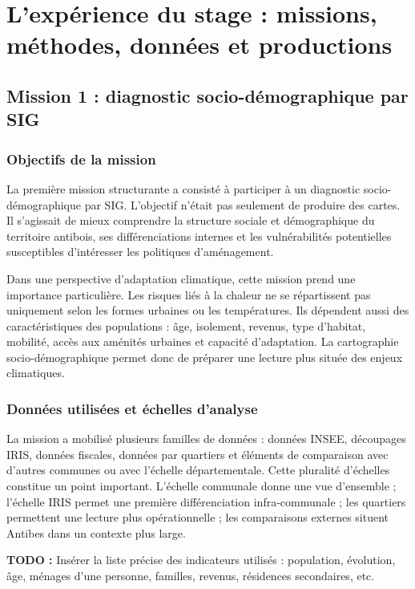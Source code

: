 \documentclass[11pt,a4paper]{report}
\newcommand{\todo}[1]{\textcolor{todored}{\textbf{TODO :} #1}}
\begin{document}
\chapter{L'expérience du stage : missions, méthodes, données et productions}

\section{Mission 1 : diagnostic socio-démographique par SIG}

\subsection{Objectifs de la mission}

La première mission structurante a consisté à participer à un diagnostic socio-démographique par SIG. L'objectif n'était pas seulement de produire des cartes. Il s'agissait de mieux comprendre la structure sociale et démographique du territoire antibois, ses différenciations internes et les vulnérabilités potentielles susceptibles d'intéresser les politiques d'aménagement.

Dans une perspective d'adaptation climatique, cette mission prend une importance particulière. Les risques liés à la chaleur ne se répartissent pas uniquement selon les formes urbaines ou les températures. Ils dépendent aussi des caractéristiques des populations : âge, isolement, revenus, type d'habitat, mobilité, accès aux aménités urbaines et capacité d'adaptation. La cartographie socio-démographique permet donc de préparer une lecture plus située des enjeux climatiques.

\subsection{Données utilisées et échelles d'analyse}

La mission a mobilisé plusieurs familles de données : données INSEE, découpages IRIS, données fiscales, données par quartiers et éléments de comparaison avec d'autres communes ou avec l'échelle départementale. Cette pluralité d'échelles constitue un point important. L'échelle communale donne une vue d'ensemble ; l'échelle IRIS permet une première différenciation infra-communale ; les quartiers permettent une lecture plus opérationnelle ; les comparaisons externes situent Antibes dans un contexte plus large.

\todo{Insérer la liste précise des indicateurs utilisés : population, évolution, âge, ménages d'une personne, familles, revenus, résidences secondaires, etc.}
\end{document}
